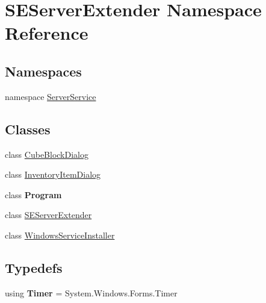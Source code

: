 \hypertarget{namespace_s_e_server_extender}{}\section{S\+E\+Server\+Extender Namespace Reference}
\label{namespace_s_e_server_extender}
\subsection*{Namespaces}
\begin{DoxyCompactItemize}
\item 
namespace \hyperlink{namespace_s_e_server_extender_1_1_server_service}{Server\+Service}
\end{DoxyCompactItemize}
\subsection*{Classes}
\begin{DoxyCompactItemize}
\item 
class \hyperlink{class_s_e_server_extender_1_1_cube_block_dialog}{Cube\+Block\+Dialog}
\item 
class \hyperlink{class_s_e_server_extender_1_1_inventory_item_dialog}{Inventory\+Item\+Dialog}
\item 
class {\bfseries Program}
\item 
class \hyperlink{class_s_e_server_extender_1_1_s_e_server_extender}{S\+E\+Server\+Extender}
\item 
class \hyperlink{class_s_e_server_extender_1_1_windows_service_installer}{Windows\+Service\+Installer}
\end{DoxyCompactItemize}
\subsection*{Typedefs}
\begin{DoxyCompactItemize}
\item 
\hypertarget{namespace_s_e_server_extender_af9ee27caee6690d28a38701ff765414f}{}using {\bfseries Timer} = System.\+Windows.\+Forms.\+Timer\label{namespace_s_e_server_extender_af9ee27caee6690d28a38701ff765414f}

\end{DoxyCompactItemize}
